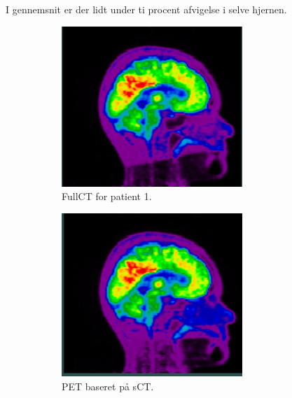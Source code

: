I gennemsnit er der lidt under ti procent afvigelse i selve hjernen.

\begin{figure}
    \centering
    \begin{subfigure}{0.3\textwidth}
        \centering
        \includegraphics[width=0.75\textwidth]{colager/loocv_pet/loocv_010476_pet_ct.png}
        \caption{FullCT for patient 1.}
        \label{col:loocv_pet_pat1_ct}
    \end{subfigure}\hfill
    \begin{subfigure}{0.3\textwidth}
        \centering
        \includegraphics[width=0.75\textwidth]{colager/loocv_pet/loocv_010476_pet_sct.png}
        \caption{PET baseret på sCT.}
        \label{col:loocv_pet_pat1_sct}
    \end{subfigure}\hfill
    \begin{subfigure}{0.3\textwidth}

\end{subfigure}
\end{figure}
